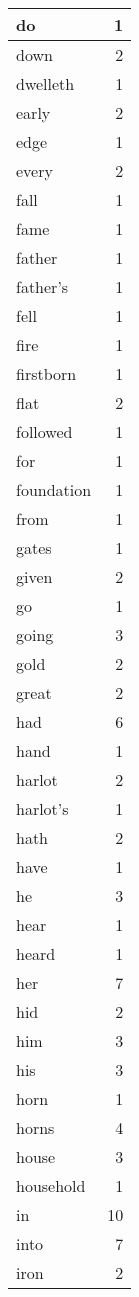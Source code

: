 \begin{center}
\begin{longtable}{l|r}
do & 1 \\ \hline
down & 2 \\ \hline
dwelleth & 1 \\ \hline
early & 2 \\ \hline
edge & 1 \\ \hline
every & 2 \\ \hline
fall & 1 \\ \hline
fame & 1 \\ \hline
father & 1 \\ \hline
father's & 1 \\ \hline
fell & 1 \\ \hline
fire & 1 \\ \hline
firstborn & 1 \\ \hline
flat & 2 \\ \hline
followed & 1 \\ \hline
for & 1 \\ \hline
foundation & 1 \\ \hline
from & 1 \\ \hline
gates & 1 \\ \hline
given & 2 \\ \hline
go & 1 \\ \hline
going & 3 \\ \hline
gold & 2 \\ \hline
great & 2 \\ \hline
had & 6 \\ \hline
hand & 1 \\ \hline
harlot & 2 \\ \hline
harlot's & 1 \\ \hline
hath & 2 \\ \hline
have & 1 \\ \hline
he & 3 \\ \hline
hear & 1 \\ \hline
heard & 1 \\ \hline
her & 7 \\ \hline
hid & 2 \\ \hline
him & 3 \\ \hline
his & 3 \\ \hline
horn & 1 \\ \hline
horns & 4 \\ \hline
house & 3 \\ \hline
household & 1 \\ \hline
in & 10 \\ \hline
into & 7 \\ \hline
iron & 2 \\ \hline

\end{longtable}
\end{center}
